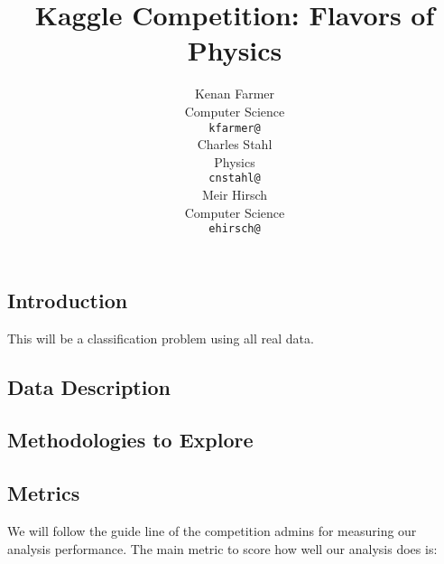 \documentclass{article} %
\title{Kaggle Competition: Flavors of Physics}
\author{
Kenan Farmer\\
Computer Science\\
\texttt{kfarmer@} \\
\And
Charles Stahl \\
Physics \\
\texttt{cnstahl@} \\
\And
Meir Hirsch\\
Computer Science \\
\texttt{ehirsch@} \\
}
\begin{document}
\maketitle

\subsection*{Introduction}
This will be a classification problem using all real data.
\subsection*{Data Description}
\subsection*{Methodologies to Explore}
\subsection*{Metrics}
We will follow the guide line of the competition admins for measuring our analysis performance. The main metric to score how well our analysis does is: 
\end{document}

